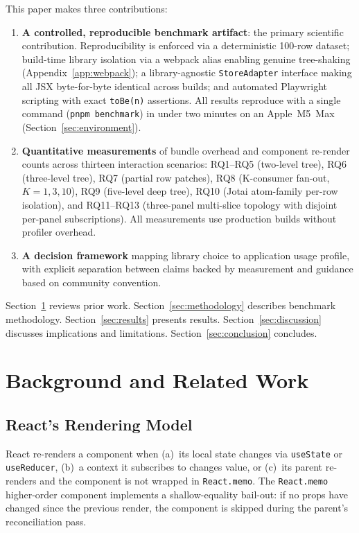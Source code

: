 \documentclass[conference]{IEEEtran}
\newcommand{\code}[1]{\texttt{\small #1}}
\begin{document}
This paper makes three contributions:
\begin{enumerate}
\item \textbf{A controlled, reproducible benchmark artifact}: the
  primary scientific contribution. Reproducibility is enforced via a
  deterministic 100-row dataset; build-time library isolation via a
  webpack alias enabling genuine tree-shaking
  (Appendix~\ref{app:webpack}); a library-agnostic \code{StoreAdapter}
  interface making all JSX byte-for-byte identical across builds; and
  automated Playwright scripting with exact \code{toBe(n)} assertions.
  All results reproduce with a single command (\code{pnpm benchmark})
  in under two minutes on an Apple~M5~Max
  (Section~\ref{sec:environment}).
\item \textbf{Quantitative measurements} of bundle overhead and
  component re-render counts across thirteen interaction scenarios:
  RQ1--RQ5 (two-level tree), RQ6 (three-level tree), RQ7 (partial row
  patches), RQ8 (K-consumer fan-out, $K{=}1,3,10$), RQ9 (five-level deep tree),
  RQ10 (Jotai atom-family per-row isolation), and RQ11--RQ13 (three-panel
  multi-slice topology with disjoint per-panel subscriptions).
  All measurements use production builds without profiler overhead.
\item \textbf{A decision framework} mapping library choice to application
  usage profile, with explicit separation between claims backed by
  measurement and guidance based on community convention.
\end{enumerate}

Section~\ref{sec:background} reviews prior work. Section~\ref{sec:methodology}
describes benchmark methodology. Section~\ref{sec:results} presents
results. Section~\ref{sec:discussion} discusses implications and
limitations. Section~\ref{sec:conclusion} concludes.

\section{Background and Related Work}
\label{sec:background}

\subsection{React's Rendering Model}

React re-renders a component when (a)~its local state changes via
\code{useState} or \code{useReducer}, (b)~a context it subscribes to
changes value, or (c)~its parent re-renders and the component is not
wrapped in \code{React.memo}. The \code{React.memo} higher-order
component implements a shallow-equality bail-out: if no props have
changed since the previous render, the component is skipped during the
parent's reconciliation pass.
\end{document}
